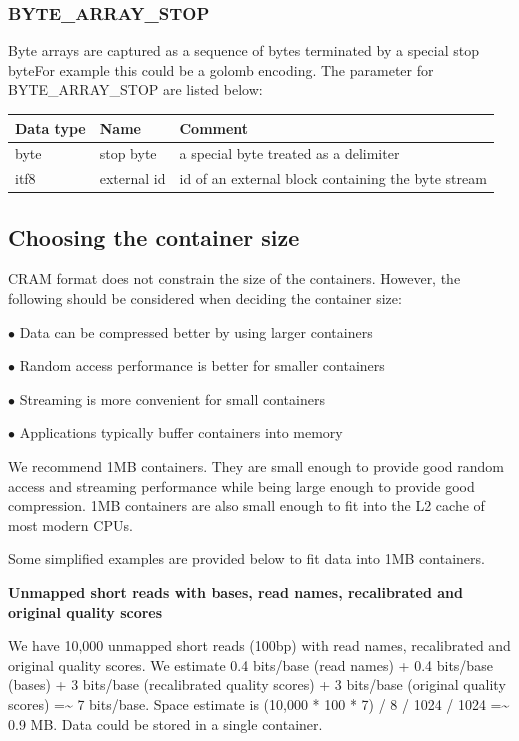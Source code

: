 \documentclass[a4paper]{article}
\begin{document}
\subsubsection*{BYTE\_ARRAY\_STOP }

Byte arrays are captured as a sequence of bytes terminated by a special stop byteFor
example this could be a golomb encoding. The parameter for BYTE\_ARRAY\_STOP are 
listed below:

\begin{tabular}{|>{\raggedright}p{100pt}|>{\raggedright}p{100pt}|>{\raggedright}p{230pt}|}
\hline
\textbf{Data type} & \textbf{Name} & \textbf{Comment}
\tabularnewline
\hline
byte & stop byte & a special byte treated as a delimiter\tabularnewline
\hline
itf8 & external id & id of an external block containing the byte stream\tabularnewline
\hline
\end{tabular}

\subsection{\textbf{Choosing the container size}}

CRAM format does not constrain the size of the containers. However, the following 
should be considered when deciding the container size:

$\bullet$ Data can be compressed better by using larger containers

$\bullet$ Random access performance is better for smaller containers 

$\bullet$ Streaming is more convenient for small containers

$\bullet$ Applications typically buffer containers into memory

We recommend 1MB containers. They are small enough to provide good random access 
and streaming performance while being large enough to provide good compression. 
1MB containers are also small enough to fit into the L2 cache of most modern CPUs.

Some simplified examples are provided below to fit data into 1MB containers.

\textbf{Unmapped short reads with bases, read names, recalibrated and original 
quality scores}

We have 10,000 unmapped short reads (100bp) with read names, recalibrated and original 
quality scores. We estimate 0.4 bits/base (read names) + 0.4 bits/base (bases) 
+ 3 bits/base (recalibrated quality scores) + 3 bits/base (original quality scores) 
=\textasciitilde{} 7 bits/base. Space estimate is (10,000 * 100 * 7) / 8 / 1024 
/ 1024 =\textasciitilde{} 0.9 MB. Data could be stored in a single container.
\end{document}
